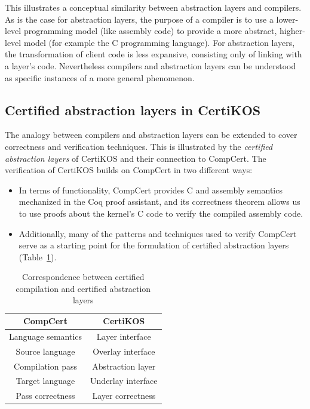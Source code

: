 \documentclass[11pt,oneside]{book}
\theoremstyle{definition}
\begin{document}
This illustrates a conceptual similarity between
abstraction layers and compilers.
As is the case for abstraction layers,
the purpose of a compiler is to use a lower-level programming model
(like assembly code)
to provide a more abstract, higher-level model
(for example the C programming language).
For abstraction layers,
the transformation of client code
is less expansive,
consisting only of linking with a layer's code.
Nevertheless compilers and abstraction layers
can be understood as specific instances
of a more general phenomenon.


\subsection{Certified abstraction layers in CertiKOS} %

The analogy between compilers and abstraction layers
can be extended to cover correctness and verification techniques.
This is illustrated by the \emph{certified abstraction layers}
of CertiKOS and their connection to CompCert.
The verification of CertiKOS builds on CompCert
in two different ways:
\begin{itemize}
\item
  In terms of functionality,
  CompCert provides C and assembly semantics
  mechanized in the Coq proof assistant,
  and its correctness theorem
  allows us to use proofs about the kernel's C code
  to verify the compiled assembly code.
\item
  Additionally,
  many of the patterns and techniques used
  to verify CompCert
  serve as a starting point for
  the formulation of certified abstraction layers
  (Table~\ref{tbl:compccal}).
\end{itemize}

\begin{table}
  \centering
  \begin{tabular}{c@{\qquad}c}
    \hline
    CompCert & CertiKOS \\
    \hline
    Language semantics & Layer interface \\
    Source language & Overlay interface \\
    Compilation pass & Abstraction layer \\
    Target language & Underlay interface \\
    Pass correctness & Layer correctness \\
    \hline
  \end{tabular}
  \caption{
    Correspondence between certified compilation
    and certified abstraction layers
  }
  \label{tbl:compccal}
\end{table}
\end{document}
